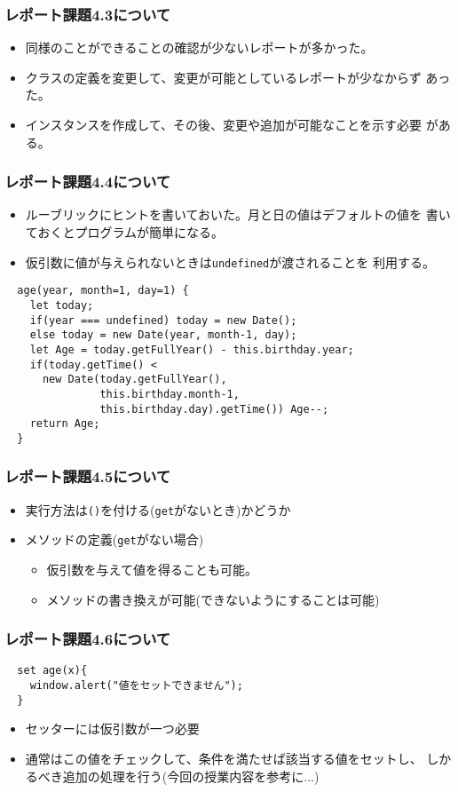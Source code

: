 \begin{frame}[containsverbatim]
 \frametitle{レポート課題4.3について}
 \begin{itemize}
  \item 同様のことができることの確認が少ないレポートが多かった。
  \item クラスの定義を変更して、変更が可能としているレポートが少なからず
        あった。
  \item インスタンスを作成して、その後、変更や追加が可能なことを示す必要
        がある。
 \end{itemize}
\end{frame}
\begin{frame}[containsverbatim]
 \frametitle{レポート課題4.4について}
\begin{itemize}
 \item ルーブリックにヒントを書いておいた。月と日の値はデフォルトの値を
       書いておくとプログラムが簡単になる。
 \item 仮引数に値が与えられないときは\texttt{undefined}が渡されることを
       利用する。
\end{itemize}
 {\small
\begin{Verbatim}
  age(year, month=1, day=1) {
    let today;
    if(year === undefined) today = new Date();
    else today = new Date(year, month-1, day);
    let Age = today.getFullYear() - this.birthday.year;
    if(today.getTime() <
      new Date(today.getFullYear(),
               this.birthday.month-1,
               this.birthday.day).getTime()) Age--;
    return Age;
  }
\end{Verbatim}
 }
\end{frame}
\begin{frame}[containsverbatim]
 \frametitle{レポート課題4.5について}
 \begin{itemize}
  \item 実行方法は\texttt{()}を付ける(\texttt{get}がないとき)かどうか
  \item メソッドの定義(\texttt{get}がない場合)
        \begin{itemize}
         \item 仮引数を与えて値を得ることも可能。
         \item メソッドの書き換えが可能(できないようにすることは可能)
        \end{itemize}
 \end{itemize}
\end{frame}
\begin{frame}[containsverbatim]
 \frametitle{レポート課題4.6について}
\begin{Verbatim}
  set age(x){
    window.alert("値をセットできません");
  }
\end{Verbatim}
\begin{itemize}
 \item セッターには仮引数が一つ必要
 \item 通常はこの値をチェックして、条件を満たせば該当する値をセットし、
       しかるべき追加の処理を行う(今回の授業内容を参考に...)
\end{itemize}
\end{frame}
